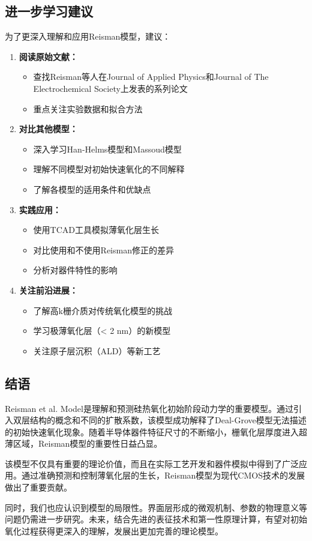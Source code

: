 \documentclass[UTF8,12pt,a4paper]{ctexart}
\begin{document}
\subsection{进一步学习建议}

为了更深入理解和应用Reisman模型，建议：

\begin{enumerate}
    \item \textbf{阅读原始文献：}
    \begin{itemize}
        \item 查找Reisman等人在Journal of Applied Physics和Journal of The Electrochemical Society上发表的系列论文
        \item 重点关注实验数据和拟合方法
    \end{itemize}
    
    \item \textbf{对比其他模型：}
    \begin{itemize}
        \item 深入学习Han-Helms模型和Massoud模型
        \item 理解不同模型对初始快速氧化的不同解释
        \item 了解各模型的适用条件和优缺点
    \end{itemize}
    
    \item \textbf{实践应用：}
    \begin{itemize}
        \item 使用TCAD工具模拟薄氧化层生长
        \item 对比使用和不使用Reisman修正的差异
        \item 分析对器件特性的影响
    \end{itemize}
    
    \item \textbf{关注前沿进展：}
    \begin{itemize}
        \item 了解高k栅介质对传统氧化模型的挑战
        \item 学习极薄氧化层（< 2 nm）的新模型
        \item 关注原子层沉积（ALD）等新工艺
    \end{itemize}
\end{enumerate}

\subsection{结语}

Reisman et al. Model是理解和预测硅热氧化初始阶段动力学的重要模型。通过引入双层结构的概念和不同的扩散系数，该模型成功解释了Deal-Grove模型无法描述的初始快速氧化现象。随着半导体器件特征尺寸的不断缩小，栅氧化层厚度进入超薄区域，Reisman模型的重要性日益凸显。

该模型不仅具有重要的理论价值，而且在实际工艺开发和器件模拟中得到了广泛应用。通过准确预测和控制薄氧化层的生长，Reisman模型为现代CMOS技术的发展做出了重要贡献。

同时，我们也应认识到模型的局限性。界面层形成的微观机制、参数的物理意义等问题仍需进一步研究。未来，结合先进的表征技术和第一性原理计算，有望对初始氧化过程获得更深入的理解，发展出更加完善的理论模型。
\end{document}
